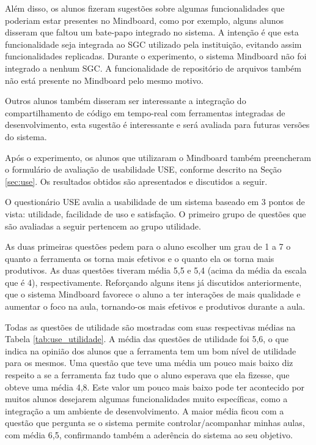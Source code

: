 Além disso, os alunos fizeram sugestões sobre algumas funcionalidades que poderiam estar presentes no Mindboard, como por exemplo, alguns alunos disseram que faltou um bate-papo integrado no sistema. A intenção é que esta funcionalidade seja integrada ao SGC utilizado pela instituição, evitando assim funcionalidades replicadas. Durante o experimento, o sistema Mindboard não foi integrado a nenhum SGC. A funcionalidade de repositório de arquivos também não está presente no Mindboard pelo mesmo motivo.

Outros alunos também disseram ser interessante a integração do compartilhamento de código em tempo-real com ferramentas integradas de desenvolvimento, esta sugestão é interessante e será avaliada para futuras versões do sistema.

Após o experimento, os alunos que utilizaram o Mindboard também preencheram o formulário de avaliação de usabilidade USE, conforme descrito na Seção \ref{sec:use}. Os resultados obtidos são apresentados e discutidos a seguir.

O questionário USE avalia a usabilidade de um sistema baseado em 3 pontos de vista: utilidade, facilidade de uso e satisfação. O primeiro grupo de questões que são avaliadas a seguir pertencem ao grupo utilidade. 


As duas primeiras questões pedem para o aluno escolher um grau de 1 a 7 o quanto a ferramenta os torna mais efetivos e o quanto ela os torna mais produtivos. As duas questões tiveram média 5,5 e 5,4 (acima da média da escala que é 4), respectivamente. Reforçando alguns itens já discutidos anteriormente, que o sistema Mindboard favorece o aluno a ter interações de mais qualidade e aumentar o foco na aula, tornando-os mais efetivos e produtivos durante a aula.

Todas as questões de utilidade são mostradas com suas respectivas médias na Tabela \ref{tab:use_utilidade}. A média das questões de utilidade foi 5,6, o que indica na opinião dos alunos que a ferramenta tem um bom nível de utilidade para os mesmos. Uma questão que teve uma média um pouco mais baixo diz respeito a se a ferramenta faz tudo que o aluno esperava que ela fizesse, que obteve uma média 4,8. Este valor um pouco mais baixo pode ter acontecido por muitos alunos desejarem algumas funcionalidades muito específicas, como a integração a um ambiente de desenvolvimento. A maior média ficou com a questão que pergunta se o sistema permite controlar/acompanhar minhas aulas, com média 6,5, confirmando também a aderência do sistema ao seu objetivo.

